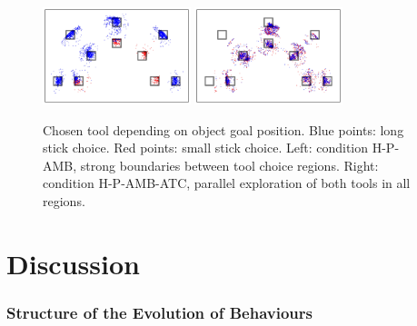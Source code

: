 \documentclass[10pt,letterpaper]{article}
\begin{document}
		
		\begin{figure}[!]
			\centering
			\includegraphics[width=4.3cm]{./include/choice-H-RGB-P-AMB.pdf}
			\hspace{-0.2cm}
			\includegraphics[width=4.3cm]{./include/choice-H-RGB-P-AMB-PGITC.pdf}
			\caption{Chosen tool depending on object goal position. Blue points: long stick choice. Red points: small stick choice. Left: condition H-P-AMB, strong boundaries 
			between tool choice regions. Right: condition H-P-AMB-ATC, parallel exploration of both tools in all regions.}
			\label{res_choice}
		\end{figure}
		
	
%


\section{Discussion}

	\subsubsection{Structure of the Evolution of Behaviours}
	
\end{document}
